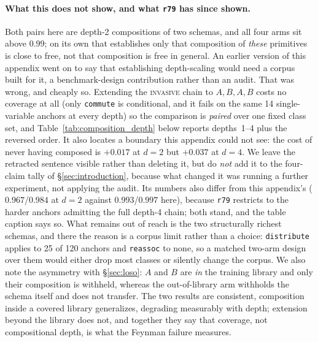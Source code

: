 \paragraph{What this does not show, and what \texttt{r79} has since shown.} Both pairs here are depth-2 compositions of two schemas, and all four arms sit above $0.99$; on its own that establishes only that composition of \emph{these} primitives is close to free, not that composition is free in general. An earlier version of this appendix went on to say that establishing depth-scaling would need a corpus built for it, a benchmark-design contribution rather than an audit. That was wrong, and cheaply so. Extending the \textsc{invasive} chain to $A,B,A,B$ costs no coverage at all (only \texttt{commute} is conditional, and it fails on the same 14 single-variable anchors at every depth) so the comparison is \emph{paired} over one fixed class set, and Table~\ref{tab:composition_depth} below reports depths~1--4 plus the reversed order. It also locates a boundary this appendix could not see: the cost of never having composed is $+0.017$ at $d{=}2$ but $+0.037$ at $d{=}4$. We leave the retracted sentence visible rather than deleting it, but do \emph{not} add it to the four-claim tally of \S\ref{sec:introduction}, because what changed it was running a further experiment, not applying the audit. Its numbers also differ from this appendix's ($0.967$/$0.984$ at $d{=}2$ against $0.993$/$0.997$ here), because \texttt{r79} restricts to the harder anchors admitting the full depth-4 chain; both stand, and the table caption says so. What remains out of reach is the two structurally richest schemas, and there the reason is a corpus limit rather than a choice: \texttt{distribute} applies to 25 of 120 anchors and \texttt{reassoc} to none, so a matched two-arm design over them would either drop most classes or silently change the corpus. We also note the asymmetry with \S\ref{sec:loso}: $A$ and $B$ are \emph{in} the training library and only their composition is withheld, whereas the out-of-library arm withholds the schema itself and does not transfer. The two results are consistent, composition inside a covered library generalizes, degrading measurably with depth; extension beyond the library does not, and together they say that coverage, not compositional depth, is what the Feynman failure measures.

